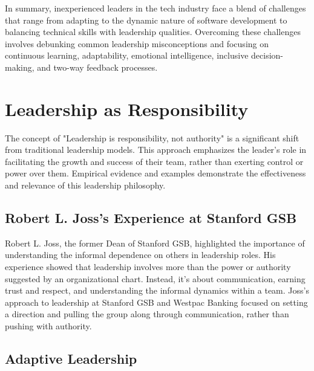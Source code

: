 \documentclass[runningheads]{llncs}
\begin{document}
\begin{description}
In summary, inexperienced leaders in the tech industry face a blend of challenges that range from adapting to the dynamic nature of software development to balancing technical skills with leadership qualities. Overcoming these challenges involves debunking common leadership misconceptions and focusing on continuous learning, adaptability, emotional intelligence, inclusive decision-making, and two-way feedback processes.
  \\

\end{description}

\section{Leadership as Responsibility}

The concept of "Leadership is responsibility, not authority" is a significant shift from traditional leadership models. This approach emphasizes the leader's role in facilitating the growth and success of their team, rather than exerting control or power over them. Empirical evidence and examples demonstrate the effectiveness and relevance of this leadership philosophy.

\subsection{Robert L. Joss's Experience at Stanford GSB}

Robert L. Joss, the former Dean of Stanford GSB, highlighted the importance of understanding the informal dependence on others in leadership roles. His experience showed that leadership involves more than the power or authority suggested by an organizational chart. Instead, it's about communication, earning trust and respect, and understanding the informal dynamics within a team. Joss's approach to leadership at Stanford GSB and Westpac Banking focused on setting a direction and pulling the group along through communication, rather than pushing with authority.

\subsection{Adaptive Leadership}
\end{document}
